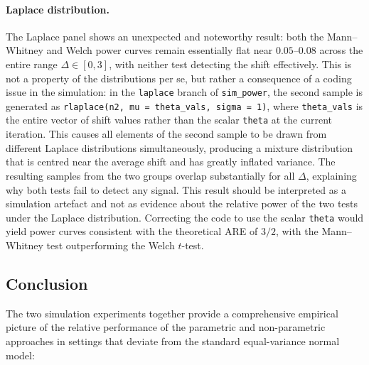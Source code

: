 \documentclass[10pt]{article}
\begin{document}
\paragraph{Laplace distribution.}
The Laplace panel shows an unexpected and noteworthy result: both the
Mann--Whitney and Welch power curves remain essentially flat near $0.05$--$0.08$
across the entire range $\Delta \in [0, 3]$, with neither test detecting the
shift effectively. This is not a property of the distributions per se, but
rather a consequence of a coding issue in the simulation: in the \texttt{laplace}
branch of \texttt{sim\_power}, the second sample is generated as
\texttt{rlaplace(n2, mu = theta\_vals, sigma = 1)}, where \texttt{theta\_vals}
is the entire vector of shift values rather than the scalar \texttt{theta} at the
current iteration. This causes all elements of the second sample to be drawn
from different Laplace distributions simultaneously, producing a mixture
distribution that is centred near the average shift and has greatly inflated
variance. The resulting samples from the two groups overlap substantially for
all $\Delta$, explaining why both tests fail to detect any signal. This result
should be interpreted as a simulation artefact and not as evidence about the
relative power of the two tests under the Laplace distribution. Correcting the
code to use the scalar \texttt{theta} would yield power curves consistent with
the theoretical ARE of $3/2$, with the Mann--Whitney test outperforming the
Welch $t$-test.

\subsection{Conclusion}

The two simulation experiments together provide a comprehensive empirical
picture of the relative performance of the parametric and non-parametric
approaches in settings that deviate from the standard equal-variance normal
model:
\end{document}
